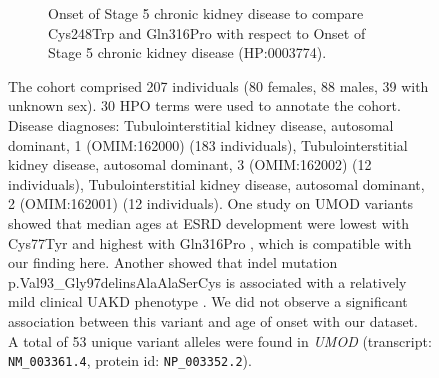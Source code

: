 
\begin{figure}[htbp]\ContinuedFloat
\begin{subfigure}[b]{0.95\textwidth}
\captionsetup{justification=raggedright,singlelinecheck=false}
\caption{Onset of Stage 5 chronic kidney disease to compare Cys248Trp and Gln316Pro with respect to Onset of Stage 5 chronic kidney disease (HP:0003774).}
\end{subfigure}

\caption{ The cohort comprised 207 individuals (80 females, 88 males, 39 with unknown sex). 30 HPO terms were used to annotate the cohort. 
Disease diagnoses: Tubulointerstitial kidney disease, autosomal dominant, 1 (OMIM:162000) (183 individuals), 
Tubulointerstitial kidney disease, autosomal dominant, 3 (OMIM:162002) (12 individuals), 
Tubulointerstitial kidney disease, autosomal dominant, 2 (OMIM:162001) (12 individuals). 
One study on UMOD variants showed that median ages at ESRD development were lowest with Cys77Tyr 
and highest with Gln316Pro \cite{PMID_23723338}, which is compatible with our finding here. Another showed that
indel mutation p.Val93\_Gly97delinsAlaAlaSerCys is associated with a relatively mild clinical UAKD phenotype \cite{PMID_22034507}. We did
not observe a significant association between this variant and age of onset with our dataset. 
A total of 53 unique variant alleles were found in \textit{UMOD} (transcript: \texttt{NM\_003361.4}, protein id: \texttt{NP\_003352.2}).}
\end{figure}
